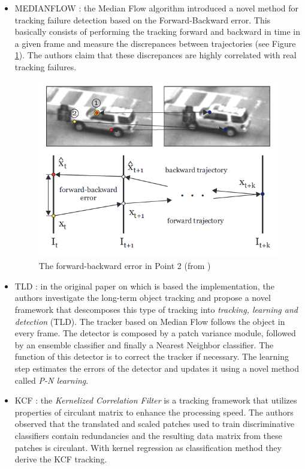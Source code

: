 \begin{itemize}
\item MEDIANFLOW \cite{kalal2010forward}: the Median Flow algorithm introduced a novel method for tracking failure detection based on the Forward-Backward error. This  basically consists of performing the tracking forward and backward in time in a given frame and measure the discrepances between trajectories (see Figure \ref{fig:medianflow}). The authors claim that these discrepances are highly correlated with real tracking failures.
\begin{figure}[H]
\begin{center}
\includegraphics[scale=0.4]{figures/medianflow.png}
\caption{The forward-backward error in Point 2 (from \cite{kalal2010forward})}
\label{fig:medianflow}
\end{center}
\end{figure}    
\item TLD \cite{kalal2011tracking}: in the original paper on which is based the implementation, the authors investigate the long-term object tracking and propose a novel framework that descomposes this type of tracking into \textit{tracking, learning and detection} (TLD). The tracker based on Median Flow follows the object in every frame. The detector is composed by a patch variance module, followed by an ensemble classifier and finally a Nearest Neighbor classifier. The function of this detector is to correct the tracker if necessary. The learning step estimates the errors of the detector and updates it using a novel method called \textit{P-N learning}.
\item KCF \cite{henriques2012exploiting}: the \textit{Kernelized Correlation Filter} is a tracking framework that utilizes properties of circulant matrix to enhance the processing speed. The authors observed that the translated and scaled patches used to train discriminative classifiers contain redundancies and the resulting data matrix from these patches is circulant. With kernel regression as classification method they derive the KCF tracking.

\end{itemize}
